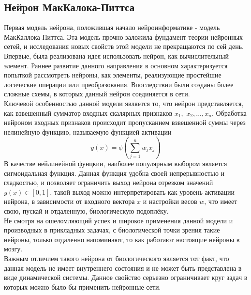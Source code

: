 \documentclass[a4paper,10pt]{article}
\begin{document}
\subsection{Нейрон МакКалока-Питтса}
   Первая модель нейрона, положившая начало нейроинформатике  - модель МакКаллока-Питтса. Эта модель прочно заложила фундамент теории нейронных сетей, и исследования новых свойств этой модели не   прекращаются по сей день.\\
   \indent Впервые, была реализована идея использовать нейрон, как вычислительный элемент. Раннее развитие данного направления в основном характеризуется попыткой рассмотреть нейроны, как элементы,        реализующие простейшие логические операции или преобразования. Впоследствии были созданы более сложные схемы, в которых данный нейрон соединяется в сети.\\
   \indent Ключевой особенностью данной модели является то, что нейрон представляется, как взвешенный сумматор входных скалярных признаков $x_{1},$ $x_{2},...,x_{n}$. Обработка нейроном входных признаков происходит пропусканием взвешенной суммы через нелинейную функцию, называемую функцией активации\\
   \begin{equation}\label{eq:sum_mp}
   y(x) = \phi(\sum_{j=1}^{n}w_{j}x_{j})
   \end{equation}
	\indent В качестве нейлинейной фунцкии, наиболее популярным выбором является сигмоидальная функция\cite{Zaencev1999}. Данная функция удобна своей непрерывностью и гладкостью, и позволяет ограничить выход нейрона  отрезком значений $y(x)\in[0,1]$, такой выход можно интерпретировать как уровень активации нейрона, в зависимости от входного вектора $x$ и настройки весов $w$, что имеет свою, пускай и отдаленную, биологическую подоплёку. \\
   \indent Не смотря на ошеломляющий успех и широкое применения данной модели  и производных в прикладных задачах, с биологической точки зрения такие нейроны, только отдаленно напоминают, то как работают настоящие нейроны в мозгу.\\
   \indent Важным отличием такого нейрона от биологического является тот факт, что данная модель не имеет внутреннего состояния и не может быть представлена в виде динамической системы\cite{Zaencev1999}. Данное свойство серьезно ограничивает круг задач в которых можно было бы применить нейронные сети. 
\end{document}

